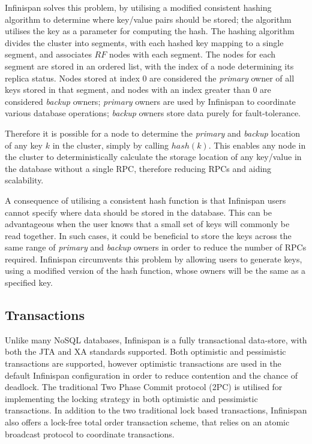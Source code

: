     Infinispan solves this problem, by utilising a modified consistent hashing algorithm \citep{Karger:1997:CHR:258533.258660, Infinispan, Ruivo:2011:ETO:2120967.2121604} to determine where key/value pairs should be stored; the algorithm utilises the key as a parameter for computing the hash.  The hashing algorithm divides the cluster into segments, with each hashed key mapping to a single segment, and associates $RF$ nodes with each segment. The nodes for each segment are stored in an ordered list, with the index of a node determining its replica status.  Nodes stored at index 0 are considered the \emph{primary} owner of all keys stored in that segment, and nodes with an index greater than 0 are considered \emph{backup} owners; \emph{primary} owners are used by Infinispan to coordinate various database operations; \emph{backup} owners store data purely for fault-tolerance.  
 
    Therefore it is possible for a node to determine the \emph{primary} and \emph{backup} location of any key $k$ in the cluster, simply by calling $hash(k)$. This enables any node in the cluster to deterministically calculate the storage location of any key/value in the database without a single RPC, therefore reducing RPCs and aiding scalability.  
    
    A consequence of utilising a consistent hash function is that Infinispan users cannot specify where data should be stored in the database. This can be advantageous when the user knows that a small set of keys will commonly be read together.  In such cases, it could be beneficial to store the keys across the same range of \emph{primary} and \emph{backup} owners in order to reduce the number of RPCs required.  Infinispan circumvents this problem by allowing users to generate keys, using a modified version of the hash function, whose owners will be the same as a specified key.  
    
    \subsection{Transactions}
    Unlike many NoSQL databases, Infinispan is a fully transactional data-store, with both the JTA\citep{JTA} and XA\citep{XA} standards supported.  Both optimistic \citep{Kung:1981:OMC:319566.319567} and pessimistic transactions are supported, however optimistic transactions are used in the default Infinispan configuration in order to reduce contention and the chance of deadlock.  The traditional Two Phase Commit protocol (2PC) is utilised for implementing the locking strategy in both optimistic and pessimistic transactions.  In addition to the two traditional lock based transactions, Infinispan also offers a lock-free total order transaction scheme, that relies on an atomic broadcast protocol to coordinate transactions.  
	    
